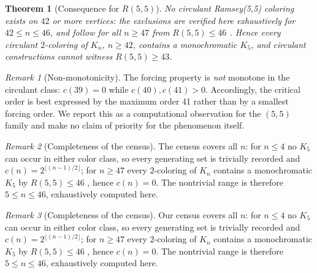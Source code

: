 \documentclass[11pt]{article}
\newtheorem{theorem}{Theorem}\newtheorem{lemma}[theorem]{Lemma}
\theoremstyle{remark}
\newtheorem{remark}{Remark}
\begin{document}
\begin{theorem}[Consequence for $R(5,5)$]\label{thm:cons}
No circulant Ramsey(5,5) coloring exists on $42$ or more vertices: the exclusions are
verified here exhaustively for $42\le n\le 46$, and follow for all $n\ge47$ from
$R(5,5)\le46$ \cite{am2024}. Hence every circulant $2$-coloring of $K_n$, $n\ge42$,
contains a monochromatic $K_5$, and circulant constructions cannot witness
$R(5,5)\ge43$.
\end{theorem}

\begin{remark}[Non-monotonicity]\label{rem:nonmon}
The forcing property is \emph{not} monotone in the circulant class: $c(39)=0$ while
$c(40),c(41)>0$. Accordingly, the critical order is best expressed by the maximum order 41
rather than by a smallest forcing order. We report this as a computational observation
for the $(5,5)$ family and make no claim of priority for the phenomenon itself.
\end{remark}

\begin{remark}[Completeness of the census]\label{rem:complete}
The census covers all $n$: for $n\le4$ no $K_5$ can occur in either color class, so every
generating set is trivially recorded and $c(n)=2^{\lfloor(n-1)/2\rfloor}$; for $n\ge47$
every $2$-coloring of $K_n$ contains a monochromatic $K_5$ by $R(5,5)\le46$ \cite{am2024},
hence $c(n)=0$. The nontrivial range is therefore $5\le n\le46$, exhaustively computed
here.
\end{remark}

\begin{remark}[Completeness of the census]\label{rem:complete}
Our census covers all $n$: for $n\le4$ no $K_5$ can occur in either color class, so every
generating set is trivially recorded and $c(n)=2^{\lfloor(n-1)/2\rfloor}$; for $n\ge47$
every $2$-coloring of $K_n$ contains a monochromatic $K_5$ by $R(5,5)\le46$
\cite{am2024}, hence $c(n)=0$. The nontrivial range is therefore $5\le n\le46$,
exhaustively computed here.
\end{remark}
\end{document}
